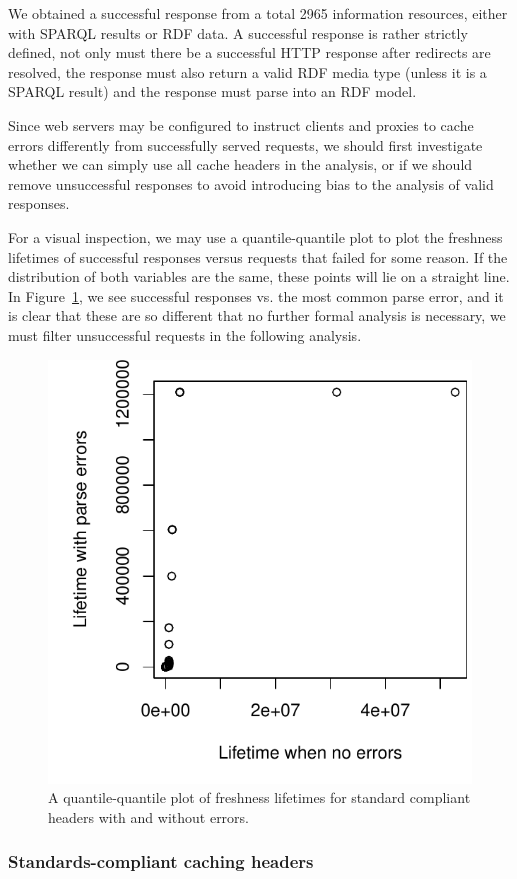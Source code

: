 \documentclass{llncs}
\begin{document}
We obtained a successful response from a total 2965 information
resources, either with SPARQL results or RDF data. A successful
response is rather strictly defined, not only must there be a
successful HTTP response after redirects are resolved, the response
must also return a valid RDF media type (unless it is a SPARQL result)
and the response must parse into an RDF model.

Since web servers may be configured to instruct clients and proxies to
cache errors differently from successfully served requests, we should
first investigate whether we can simply use all cache headers in the
analysis, or if we should remove unsuccessful responses to avoid
introducing bias to the analysis of valid responses.

For a visual inspection, we may use a quantile-quantile plot to plot
the freshness lifetimes of successful responses versus requests that
failed for some reason. If the distribution of both variables are the
same, these points will lie on a straight line. In
Figure~\ref{fig:errorsqq}, we see successful responses vs. the most
common parse error, and it is clear that these are so different that
no further formal analysis is necessary, we must filter unsuccessful
requests in the following analysis.


\begin{figure}[ht!]
  \centerline{%
    \includegraphics[width=.5\textwidth]{errorsqq.pdf}}
  \caption{A quantile-quantile plot of freshness lifetimes for
    standard compliant headers with and without errors.}
  \label{fig:errorsqq}
\end{figure}


\subsubsection{Standards-compliant caching headers}
\end{document}

